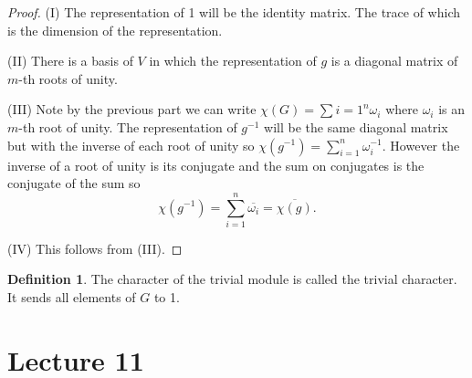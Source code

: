 \documentclass[11pt, notitlepage]{article}
\numberwithin{equation}{section}
\theoremstyle{plain}
\theoremstyle{definition}
\newtheorem{definition}[theorem]{Definition}
\begin{document}
\begin{proof}
(I) The representation of 1 will be the identity matrix. The trace of which is the dimension of the representation.

(II) There is a basis of $V$ in which the representation of $g$ is a diagonal matrix of $m$-th roots of unity.

(III) Note by the previous part we can write $\chi(G) = \sum{i=1}^n\omega_i$ where $\omega_i$ is an $m$-th root of unity. The representation of $g^{-1}$ will be the same diagonal matrix but with the inverse of each root of unity so $\chi(g^{-1}) = \sum_{i=1}^n \omega_i^{-1}$. However the inverse of a root of unity is its conjugate and the sum on conjugates is the conjugate of the sum so
\[
	\chi(g^{-1}) = \sum_{i=1}^n\overline{\omega_i} =\overline{\chi(g)}.
\]

(IV) This follows from (III).
\end{proof}

\begin{definition}
The character of the trivial module is called the trivial character. It sends all elements of $G$ to 1. 
\end{definition}

\section{Lecture 11}
\end{document}
